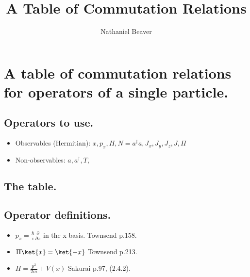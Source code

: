 \documentclass[12pt,letterpaper]{article}
\author{Nathaniel Beaver}
\title{A Table of Commutation Relations}
\begin{document}
\maketitle

\section{A table of commutation relations for operators of a single particle.}

\subsection{Operators to use.}

\begin{itemize}
\item Observables (Hermitian): $x, p_x, H, N=a^\dagger a, J_x, J_y, J_z, J, \hyperref[def_Pi]{\Pi}$
\item Non-observables: $a, a^\dagger, T, $
\end{itemize}

\subsection{The table.}

\renewcommand{\dtldisplayafterhead}{\hline} %
\renewcommand{\dtlstringalign}{c} %



\newpage

\subsection{Operator definitions.}
\begin{itemize}
\item \label{def_p_x} $p_x = \frac{\hbar}{i}\frac{\partial}{\partial x}$ in the x-basis. Townsend p.158.
\item \label{def_Pi} $\Pi\ket{x}=\ket{-x}$ Townsend p.213.
\item \label{def_H} $H = \frac{p^2}{2m} + V(x)$ Sakurai p.97, (2.4.2). 
\end{itemize}
\end{document}

